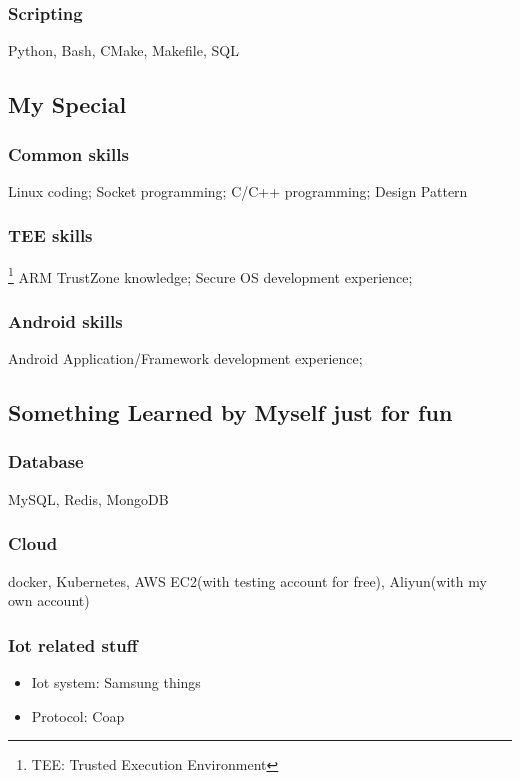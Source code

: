 \documentclass{article}
\begin{document}
\subsubsection{Scripting}
Python, Bash, CMake, Makefile, SQL

\subsection{My Special}

\subsubsection {Common skills}
Linux coding; Socket programming; C/C++ programming; Design Pattern

\subsubsection {TEE skills} \footnote{TEE: Trusted Execution Environment}
ARM TrustZone\circledR{} knowledge; Secure OS development experience;

\subsubsection {Android skills}
Android Application/Framework development experience;

\subsection {Something Learned by Myself just for fun}
\subsubsection {Database}
MySQL, Redis, MongoDB

\subsubsection {Cloud}
docker, Kubernetes, AWS EC2(with testing account for free), Aliyun(with my own account)

\subsubsection{Iot related stuff}
\begin{itemize}
\item[1] Iot system: Samsung things
\item[2] Protocol: Coap
\end{itemize}
\end{document}
